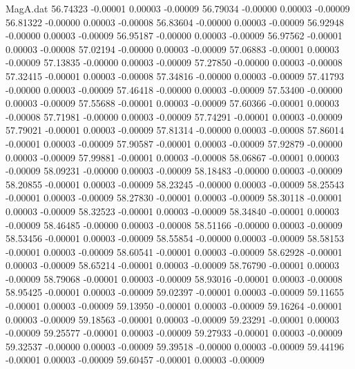 \begin{filecontents}{MagA.dat}
  56.74323   -0.00001    0.00003   -0.00009
  56.79034   -0.00000    0.00003   -0.00009
  56.81322   -0.00000    0.00003   -0.00008
  56.83604   -0.00000    0.00003   -0.00009
  56.92948   -0.00000    0.00003   -0.00009
  56.95187   -0.00000    0.00003   -0.00009
  56.97562   -0.00001    0.00003   -0.00008
  57.02194   -0.00000    0.00003   -0.00009
  57.06883   -0.00001    0.00003   -0.00009
  57.13835   -0.00000    0.00003   -0.00009
  57.27850   -0.00000    0.00003   -0.00008
  57.32415   -0.00001    0.00003   -0.00008
  57.34816   -0.00000    0.00003   -0.00009
  57.41793   -0.00000    0.00003   -0.00009
  57.46418   -0.00000    0.00003   -0.00009
  57.53400   -0.00000    0.00003   -0.00009
  57.55688   -0.00001    0.00003   -0.00009
  57.60366   -0.00001    0.00003   -0.00008
  57.71981   -0.00000    0.00003   -0.00009
  57.74291   -0.00001    0.00003   -0.00009
  57.79021   -0.00001    0.00003   -0.00009
  57.81314   -0.00000    0.00003   -0.00008
  57.86014   -0.00001    0.00003   -0.00009
  57.90587   -0.00001    0.00003   -0.00009
  57.92879   -0.00000    0.00003   -0.00009
  57.99881   -0.00001    0.00003   -0.00008
  58.06867   -0.00001    0.00003   -0.00009
  58.09231   -0.00000    0.00003   -0.00009
  58.18483   -0.00000    0.00003   -0.00009
  58.20855   -0.00001    0.00003   -0.00009
  58.23245   -0.00000    0.00003   -0.00009
  58.25543   -0.00001    0.00003   -0.00009
  58.27830   -0.00001    0.00003   -0.00009
  58.30118   -0.00001    0.00003   -0.00009
  58.32523   -0.00001    0.00003   -0.00009
  58.34840   -0.00001    0.00003   -0.00009
  58.46485   -0.00000    0.00003   -0.00008
  58.51166   -0.00000    0.00003   -0.00009
  58.53456   -0.00001    0.00003   -0.00009
  58.55854   -0.00000    0.00003   -0.00009
  58.58153   -0.00001    0.00003   -0.00009
  58.60541   -0.00001    0.00003   -0.00009
  58.62928   -0.00001    0.00003   -0.00009
  58.65214   -0.00001    0.00003   -0.00009
  58.76790   -0.00001    0.00003   -0.00009
  58.79068   -0.00001    0.00003   -0.00009
  58.93016   -0.00001    0.00003   -0.00008
  58.95425   -0.00001    0.00003   -0.00009
  59.02397   -0.00001    0.00003   -0.00009
  59.11655   -0.00001    0.00003   -0.00009
  59.13950   -0.00001    0.00003   -0.00009
  59.16264   -0.00001    0.00003   -0.00009
  59.18563   -0.00001    0.00003   -0.00009
  59.23291   -0.00001    0.00003   -0.00009
  59.25577   -0.00001    0.00003   -0.00009
  59.27933   -0.00001    0.00003   -0.00009
  59.32537   -0.00000    0.00003   -0.00009
  59.39518   -0.00000    0.00003   -0.00009
  59.44196   -0.00001    0.00003   -0.00009
  59.60457   -0.00001    0.00003   -0.00009

\end{filecontents}
